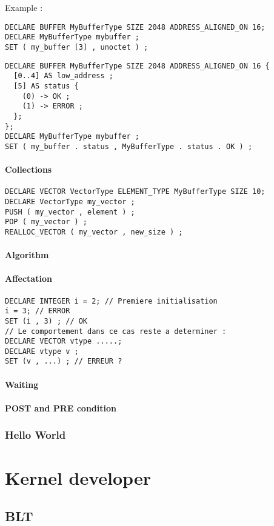 \documentclass[american]{rtxreport}
\begin{document}
Example :
\begin{lstlisting}
DECLARE BUFFER MyBufferType SIZE 2048 ADDRESS_ALIGNED_ON 16;
DECLARE MyBufferType mybuffer ;
SET ( my_buffer [3] , unoctet ) ;
\end{lstlisting}


\begin{lstlisting}
DECLARE BUFFER MyBufferType SIZE 2048 ADDRESS_ALIGNED_ON 16 {
  [0..4] AS low_address ;
  [5] AS status {
    (0) -> OK ;
    (1) -> ERROR ;
  };
};
DECLARE MyBufferType mybuffer ;
SET ( my_buffer . status , MyBufferType . status . OK ) ;
\end{lstlisting}

\subsubsection{Collections}

\begin{lstlisting}
DECLARE VECTOR VectorType ELEMENT_TYPE MyBufferType SIZE 10;
DECLARE VectorType my_vector ;
PUSH ( my_vector , element ) ;
POP ( my_vector ) ;
REALLOC_VECTOR ( my_vector , new_size ) ;
\end{lstlisting}

\subsubsection{Algorithm}

\subsubsection{Affectation}

\begin{lstlisting}
DECLARE INTEGER i = 2; // Premiere initialisation
i = 3; // ERROR
SET (i , 3) ; // OK
// Le comportement dans ce cas reste a determiner :
DECLARE VECTOR vtype .....;
DECLARE vtype v ;
SET (v , ...) ; // ERREUR ?
\end{lstlisting}

\subsubsection{Waiting}

\subsubsection{POST and PRE condition}

\subsection{Hello World}

\chapter{Kernel developer}

\section {BLT}

\end{document}
